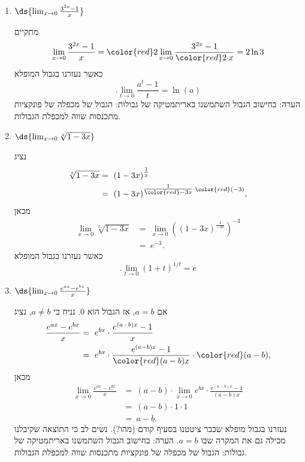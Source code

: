 \begin{enumerate}
\item $\ds{ \lim_{x \to 0} \frac{3^{2x} - 1}{x}}$

\ifsol
\begin{solbox}
מתקיים
\begin{align*}
    \lim_{x \to 0} \frac{3^{2x} - 1}{x}={\color{red}2}\lim_{x \to 0} \frac{3^{2x} - 1}{{\color{red}2\cdot}x}
    = 2\ln3
\end{align*}
כאשר נעזרנו בגבול המופלא
$$.\lim_{t\to0}\frac{a^t-1}{t}=\ln(a)$$
הערה: בחישוב הגבול השתמשנו באריתמטיקה של גבולות: הגבול של מכפלה של פונקציות מתכנסות שווה למכפלת הגבולות.
\end{solbox}
\fi

\item $\ds{ \lim_{x \to 0} \sqrt[x]{1-3x}}$

\ifsol
{}
\begin{solbox}
נציג
\begin{align*}
    \sqrt[x]{1-3x}&=\ (1-3x)^{\tfrac{1}{x}}\\
    &=\ (1-3x)^{\tfrac{1}{{\color{red}-3}x}\cdot{\color{red}(-3)}},
\end{align*}
מכאן
\begin{align*}
    \lim_{x \to 0} \sqrt[x]{1-3x}&=\ \lim_{x \to 0}\left((1-3x)^{\tfrac{1}{{-3}x}}\right)^{-3}\\
    &=\ e^{-3}.
\end{align*}
כאשר נעזרנו בגבול המופלא
$$.\lim_{t\to0}(1+t)^{1/t}=e$$
\end{solbox}
\fi

\item $\ds{ \lim_{x \to 0} \frac{e^{ax}-e^{bx}}{x}}$

\ifsol
{}
\begin{solbox}
אם
$a=b$,
אז הגבול הוא
$0$.
נניח כי
$a\neq b$,
נציג
\begin{align*}
    \frac{e^{ax}-e^{bx}}{x}&=\ e^{bx}\cdot\frac{e^{(a-b)x}-1}{x}\\
    &=\ e^{bx}\cdot\frac{e^{(a-b)x}-1}{{\color{red}(a-b)}x}\cdot{\color{red}(a-b)},
\end{align*}
מכאן
\begin{align*}
    \lim_{x\to 0}\frac{e^{ax}-e^{bx}}{x}
    &=\ (a-b)\cdot\lim_{x\to 0}e^{bx}\cdot\frac{e^{(a-b)x}-1}{{(a-b)}x}\\
    &=\ (a-b)\cdot1\cdot1\\
    &=\ a-b.
\end{align*}
נעזרנו בגבול מופלא שכבר ציטטנו בסעיף קודם (מהו?).
נשים לב כי התוצאה שקיבלנו מכילה גם את המקרה שבו
$a=b$.
הערה: בחישוב הגבול השתמשנו באריתמטיקה של גבולות: הגבול של מכפלה של פונקציות מתכנסות שווה למכפלת הגבולות.
\end{solbox}
\fi


\end{enumerate}
